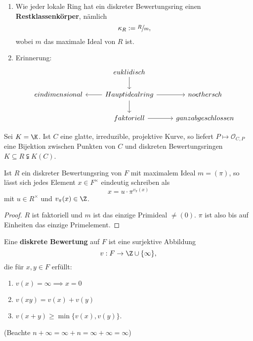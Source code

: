 \begin{bemerkungnr}
    \begin{enumerate}[label=\alph*)]
        \item Wie jeder lokale Ring hat ein diskreter Bewertungsring einen \textbf{Restklassenkörper}, nämlich
        $$ \kappa_R := \sfrac{R}{m}, $$
        wobei $m$ das maximale Ideal von $R$ ist.

        \item Erinnerung:
        $$\begin{tikzcd}
            & euklidisch \dar& \\
            eindimensional & \lar Hauptidealring \dar \rar & noethersch\\
            & faktoriell \rar & ganz abgeschlossen
        \end{tikzcd}$$
    \end{enumerate}
\end{bemerkungnr}

\begin{theorem}
    Sei $K = \K$. Ist $C$ eine glatte, irreduzible, projektive Kurve, so liefert
    $ P \mapsto \mathcal{O}_{C,P}$ eine Bijektion zwischen Punkten von $C$ und diskreten
    Bewertungsringen $K \subseteq R \subsetneqq K(C)$.
\end{theorem}

\begin{satz}
    Ist $R$ ein diskreter Bewertungsring von $F$ mit maximalem Ideal $m = (\pi)$, so lässt sich jedes Element $x \in F^\times$ 
    eindeutig schreiben als
    $$ x = u \cdot \pi^{v_\pi(x)}$$
    mit $u \in R^\times$ und $v_\pi(x) \in \Z$.
\end{satz}
\begin{proof}
    $R$ ist faktoriell und $m$ ist das einzige Primideal $\ne (0)$. $\pi$ ist also bis auf Einheiten das einzige Primelement.
\end{proof}

\begin{definition}
    Eine \textbf{diskrete Bewertung} auf $F$ ist eine surjektive Abbildung
    $$ v: F \to \Z \cup \{\infty\},$$
    die für $x,y \in F$ erfüllt:
    \begin{enumerate}[label=(\arabic*)]
        \item $v(x) = \infty \implies x = 0$
        \item $v(xy) = v(x) + v(y)$
        \item $v(x+y) \geq \min\{v(x), v(y)\}$.
    \end{enumerate}
    (Beachte $n + \infty = \infty + n = \infty + \infty = \infty$)
\end{definition}

